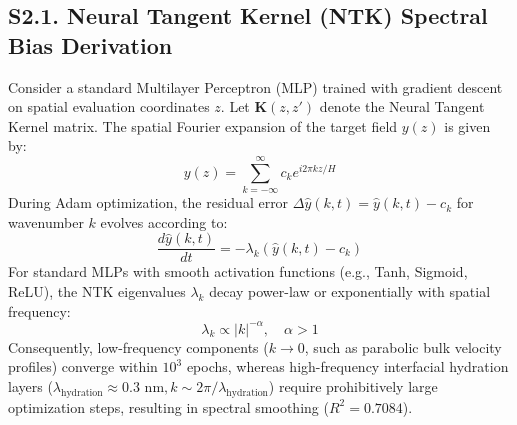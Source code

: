 \documentclass[3p,preprint,12pt,numbers,square,sort&compress]{elsarticle}
\begin{document}
\subsection{S2.1. Neural Tangent Kernel (NTK) Spectral Bias Derivation}
Consider a standard Multilayer Perceptron (MLP) trained with gradient descent on spatial evaluation coordinates $z$. Let $\mathbf{K}(z, z')$ denote the Neural Tangent Kernel matrix. The spatial Fourier expansion of the target field $y(z)$ is given by:
\begin{equation}
    y(z) = \sum_{k=-\infty}^{\infty} c_k e^{i 2\pi k z / H}
    \tag{S4}
\end{equation}
During Adam optimization, the residual error $\Delta \hat{y}(k, t) = \hat{y}(k, t) - c_k$ for wavenumber $k$ evolves according to:
\begin{equation}
    \frac{d \hat{y}(k, t)}{dt} = -\lambda_k \left( \hat{y}(k, t) - c_k \right)
    \tag{S5}
\end{equation}
For standard MLPs with smooth activation functions (e.g., Tanh, Sigmoid, ReLU), the NTK eigenvalues $\lambda_k$ decay power-law or exponentially with spatial frequency:
\begin{equation}
    \lambda_k \propto |k|^{-\alpha}, \quad \alpha > 1
    \tag{S6}
\end{equation}
Consequently, low-frequency components ($k \to 0$, such as parabolic bulk velocity profiles) converge within $10^3$ epochs, whereas high-frequency interfacial hydration layers ($\lambda_{\text{hydration}} \approx 0.3\text{ nm}, k \sim 2\pi / \lambda_{\text{hydration}}$) require prohibitively large optimization steps, resulting in spectral smoothing ($R^2 = 0.7084$).
\end{document}
